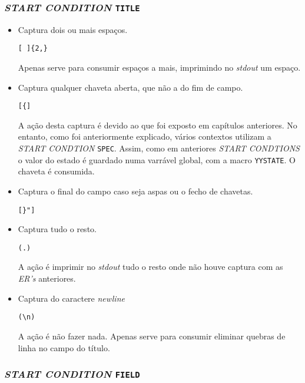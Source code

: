 \subsubsection{\emph{START CONDITION} \texttt{TITLE}}

\begin{itemize}
\item Captura dois ou mais espaços.
\begin{verbatim}
[ ]{2,}
\end{verbatim}

Apenas serve para consumir espaços a mais, imprimindo no \emph{stdout} um espaço.

\item Captura qualquer chaveta aberta, que não a do fim de campo.
\begin{verbatim}
[{]
\end{verbatim}

A ação desta captura é devido ao que foi exposto em capítulos anteriores. No entanto, como foi anteriormente explicado, vários contextos utilizam a \emph{START CONDTION} \texttt{SPEC}. Assim, como em anteriores \emph{START CONDTIONS} o valor do estado é guardado numa varrável global, com a macro \texttt{YYSTATE}. O chaveta é consumida.

\item Captura o final do campo caso seja aspas ou o fecho de chavetas.
\begin{verbatim}
[}"]
\end{verbatim}

\item Captura tudo o resto.
\begin{verbatim}
(.)
\end{verbatim}
A ação é imprimir no \emph{stdout} tudo o resto onde não houve captura com as \emph{ER's} anteriores.

\item Captura do caractere \emph{newline}
\begin{verbatim}
(\n)
\end{verbatim}

A ação é não fazer nada. Apenas serve para consumir eliminar quebras de linha no campo do título.


\end{itemize}

\subsubsection{\emph{START CONDITION} \texttt{FIELD}}

